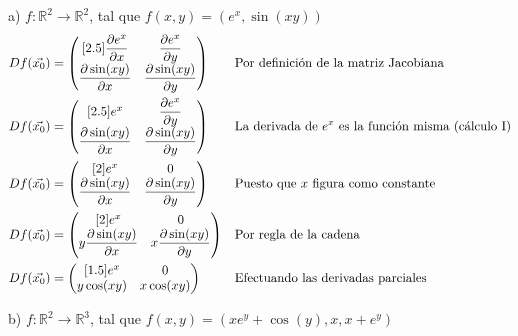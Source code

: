 \documentclass[letterpaper]{article}
\renewcommand{\d}{\partial}
\renewcommand{\*}{\cdot}
\theoremstyle{definition}
\begin{document}
\noindent a) $f: \mathbb{R}^2  \longrightarrow \mathbb{R}^2$, tal que $f(x,y) = (e^x,\sin(xy))$
\begin{align*}
	Df(\vec{x_0}) &= \begin{pmatrix}[2.5]
	\dfrac{\d e^x}{\d x} & \dfrac{\d e^x}{\d y}\\
	\dfrac{\d \sin(xy)}{\d x} & \dfrac{\d \sin(xy)}{\d y}\\
	\end{pmatrix} && \text{Por definición de la matriz Jacobiana}\\
	Df(\vec{x_0}) &= \begin{pmatrix}[2.5]
	e^x & \dfrac{\d e^x}{\d y}\\
	\dfrac{\d \sin(xy)}{\d x} & \dfrac{\d \sin(xy)}{\d y}\\
	\end{pmatrix} && \text{La derivada de $ e^x $ es la función misma (cálculo I)}\\
	Df(\vec{x_0}) &= \begin{pmatrix}[2]
	e^x & 0\\
	\dfrac{\d \sin(xy)}{\d x} & \dfrac{\d \sin(xy)}{\d y}\\
	\end{pmatrix} && \text{Puesto que $ x $ figura como constante}\\
	Df(\vec{x_0}) &= \begin{pmatrix}[2]
	e^x & 0\\
	y\dfrac{\d \sin(xy)}{\d x} & x\dfrac{\d \sin(xy)}{\d y}\\
	\end{pmatrix} && \text{Por regla de la cadena}\\
	Df(\vec{x_0}) &= \begin{pmatrix}[1.5]
	e^x & 0\\
	y\cos(xy) &x\cos(xy)\\
	\end{pmatrix} && \text{Efectuando las derivadas parciales}\\
\end{align*}


\noindent b) $f: \mathbb{R}^2  \longrightarrow \mathbb{R}^3$, tal que $f(x,y) = (xe^y + \cos(y), x, x + e^y)$
\end{document}
